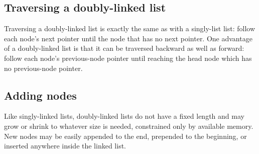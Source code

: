 \documentclass{article}
\begin{document}
%


  \subsection{Traversing a doubly-linked list}
  Traversing a doubly-linked list is exactly the same as with a singly-list list: follow each node's next pointer until the node that has no next pointer. One advantage of a doubly-linked list is that it can be traversed backward as well as forward: follow each node's previous-node pointer until reaching the head node which has no previous-node pointer.
  \subsection{Adding nodes}
  Like singly-linked lists, doubly-linked lists do not have a fixed length and may grow or shrink to whatever size is needed, constrained only by available memory. New nodes may be easily appended to the end, prepended to the beginning, or inserted anywhere inside the linked list.
\end{document}
